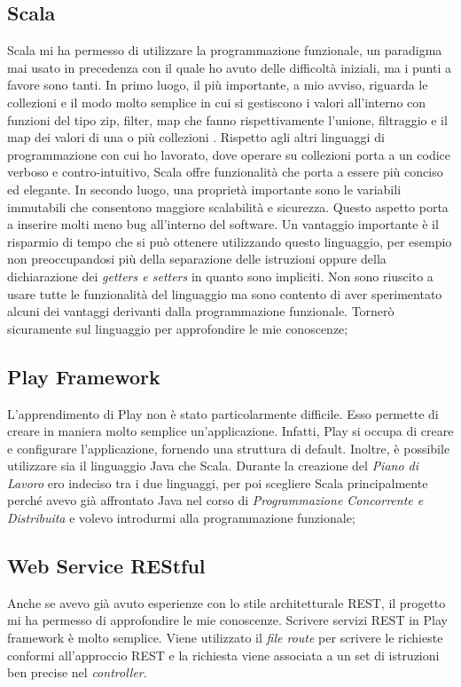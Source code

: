 	\subsection*{Scala}  
	Scala mi ha permesso di utilizzare la programmazione funzionale, un paradigma mai usato in precedenza con il quale ho avuto delle difficoltà iniziali, ma i punti a favore sono tanti. In primo luogo, il più importante, a mio avviso, riguarda le collezioni e il modo molto semplice in cui si gestiscono i valori all'interno con funzioni del tipo zip, filter, map che fanno rispettivamente l'unione, filtraggio e il map dei valori di una o più collezioni . Rispetto agli altri linguaggi di programmazione con cui ho lavorato, dove operare su collezioni porta a un codice verboso e contro-intuitivo, Scala offre funzionalità che porta a essere più conciso ed elegante. In secondo luogo, una proprietà importante sono le variabili immutabili che consentono maggiore scalabilità e sicurezza. Questo aspetto porta a inserire molti meno bug all'interno del software. Un vantaggio importante è il risparmio di tempo che si può ottenere utilizzando questo linguaggio, per esempio non preoccupandosi più della separazione delle istruzioni oppure della dichiarazione dei \textit{getters e setters} in quanto sono impliciti. Non sono riuscito a usare tutte le funzionalità del linguaggio ma sono contento di aver sperimentato alcuni dei vantaggi derivanti dalla programmazione funzionale. Tornerò sicuramente sul linguaggio per approfondire le mie conoscenze;
	
	\subsection*{Play Framework}
	L'apprendimento di Play non è stato particolarmente difficile. Esso permette di creare in maniera molto semplice un'applicazione. Infatti, Play si occupa di creare e configurare l'applicazione, fornendo una struttura di default. Inoltre, è possibile utilizzare sia il linguaggio Java che Scala. Durante la creazione del \textit{Piano di Lavoro} ero indeciso tra i due linguaggi, per poi scegliere Scala principalmente perché avevo già affrontato Java nel corso di \textit{Programmazione Concorrente e Distribuita} e volevo introdurmi alla programmazione funzionale;
	
	\subsection*{Web Service REStful}
	 Anche se avevo già avuto esperienze con lo stile architetturale \gls{REST}, il progetto mi ha permesso di approfondire le mie conoscenze. Scrivere servizi \gls{REST} in Play framework è molto semplice. Viene utilizzato il \textit{file route} per scrivere le richieste conformi all'approccio \gls{REST} e la richiesta viene associata a un set di istruzioni ben precise nel \textit{controller}.\\ 
	 
